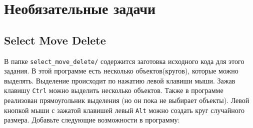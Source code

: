 \documentclass{article}
\begin{document}
\section{Необязательные задачи}


\subsection{Select Move Delete}
 В папке \texttt{select\_move\_delete/} содержится заготовка исходного кода для этого задания. В этой программе есть несколько объектов(кругов), которые можно выделять. Выделение происходит по нажатию левой клавиши мыши. Зажав клавишу \texttt{Ctrl} можно выделить несколько объектов. Также в программе реализован прямоугольник выделения (но он пока не выбирает объекты). Левой кнопкой мыши с зажатой клавишей левый \texttt{Alt} можно создать круг случайного размера. Добавьте следующие возможности в программу:
\end{document}
